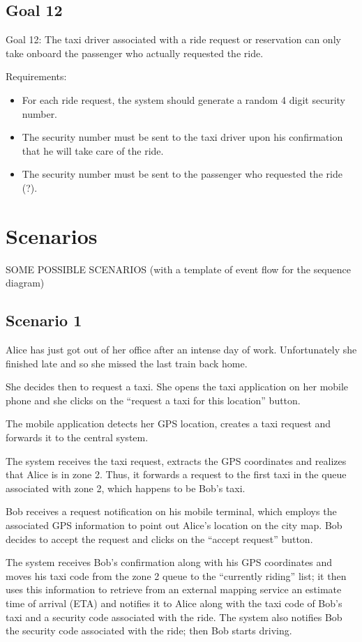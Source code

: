 \subsection{Goal 12}
Goal 12: The taxi driver associated with a ride request or reservation can only take onboard the passenger who actually requested the ride.

Requirements:
\begin{itemize}
\item For each ride request, the system should generate a random 4 digit security number.
\item The security number must be sent to the taxi driver upon his confirmation that he will take care of the ride.
\item The security number must be sent to the passenger who requested the ride (?).
\end{itemize}

\section{Scenarios}
SOME POSSIBLE SCENARIOS
(with a template of event flow for the sequence diagram)
\subsection{Scenario 1}
Alice has just got out of her office after an intense day of work. Unfortunately she finished late and so she missed the last train back home.

She decides then to request a taxi. She opens the taxi application on her mobile phone and she clicks on the “request a taxi for this location” button.

The mobile application detects her GPS location, creates a taxi request and forwards it to the central system.

The system receives the taxi request, extracts the GPS coordinates and realizes that Alice is in zone 2. Thus, it forwards a request to the first taxi in the queue associated with zone 2, which happens to be Bob’s taxi.

Bob receives a request notification on his mobile terminal, which employs the associated GPS information to point out Alice’s location on the city map. Bob decides to accept the request and clicks on the “accept request” button.

The system receives Bob’s confirmation along with his GPS coordinates and moves his taxi code from the zone 2 queue to the “currently riding” list; it then uses this information to retrieve from an external mapping service an estimate time of arrival (ETA) and notifies it to Alice along with the taxi code of Bob’s taxi and a security code associated with the ride. The system also notifies Bob the security code associated with the ride; then Bob starts driving.

